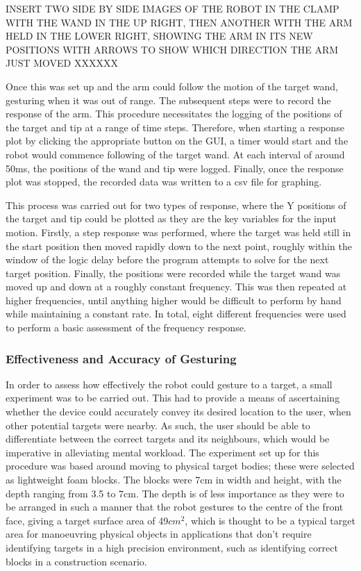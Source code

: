 \documentclass[11pt]{article}
\begin{document}
INSERT TWO SIDE BY SIDE IMAGES OF THE ROBOT IN THE CLAMP WITH THE WAND IN THE UP RIGHT, THEN ANOTHER WITH THE ARM HELD IN THE LOWER RIGHT, SHOWING THE ARM IN ITS NEW POSITIONS WITH ARROWS TO SHOW WHICH DIRECTION THE ARM JUST MOVED XXXXXX

Once this was set up and the arm could follow the motion of the target wand, gesturing when it was out of range. The subsequent steps were to record the response of the arm. This procedure necessitates the logging of the positions of the target and tip at a range of time steps. Therefore, when starting a response plot by clicking the appropriate button on the GUI, a timer would start and the robot would commence following of the target wand. At each interval of around 50ms, the positions of the wand and tip were logged. Finally, once the response plot was stopped, the recorded data was written to a csv file for graphing. 

This process was carried out for two types of response, where the Y positions of the target and tip could be plotted as they are the key variables for the input motion. Firstly, a step response was performed, where the target was held still in the start position then moved rapidly down to the next point, roughly within the window of the logic delay before the program attempts to solve for the next target position. Finally, the positions were recorded while the target wand was moved up and down at a roughly constant frequency. This was then repeated at higher frequencies, until anything higher would be difficult to perform by hand while maintaining a constant rate. In total, eight different frequencies were used to perform a basic assessment of the frequency response.


\subsubsection{Effectiveness and Accuracy of Gesturing}

In order to assess how effectively the robot could gesture to a target, a small experiment was to be carried out. This had to provide a means of ascertaining whether the device could accurately convey its desired location to the user, when other potential targets were nearby. As such, the user should be able to differentiate between the correct targets and its neighbours, which would be imperative in alleviating mental workload. The experiment set up for this procedure was based around moving to physical target bodies; these were selected as lightweight foam blocks. The blocks were 7cm in width and height, with the depth ranging from 3.5 to 7cm. The depth is of less importance as they were to be arranged in such a manner that the robot gestures to the centre of the front face, giving a target surface area of 49$cm^{2}$, which is thought to be a typical target area for manoeuvring physical objects in applications that don't require identifying targets in a high precision environment, such as identifying correct blocks in a construction scenario.
\end{document}
